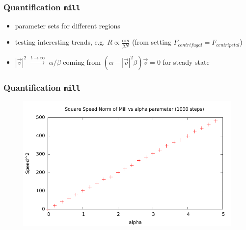 \documentclass[compress]{beamer}
\begin{document}
\begin{frame}
	\frametitle{Quantification \texttt{mill}}
	\begin{itemize}
		\item parameter sets for different regions
		\item testing interesting trends, e.g. \( R \propto \frac{\alpha m}{\beta N}\) (from setting \( F_{centrifugal} = F_{centripetal} \))
		\item \( |\vec{v}|^{2} \) \( \xrightarrow{t \to \infty} \) \( \alpha / \beta \) coming from \( (\alpha - |\vec{v}|^2 \beta ) \vec{v} = 0 \) for steady state
	\end{itemize}
\end{frame}


\begin{frame}
	\frametitle{Quantification \texttt{mill}}
	\begin{figure}[H]
		\includegraphics[width=1. \columnwidth]{../plots/mill_II_square_alpha_1000.pdf}
	\end{figure}
\end{frame}
\end{document}
